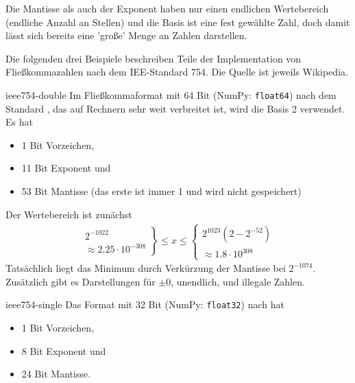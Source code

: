 \begin{intro}
  Die Mantisse als auch der Exponent haben nur einen endlichen Wertebereich
  (endliche Anzahl an Stellen) und die Basis ist eine fest gewählte Zahl, doch damit lässt sich
  bereits eine 'große' Menge an Zahlen darstellen.
  
  Die folgenden drei Beispiele beschreiben Teile der Implementation
  von Fließkommazahlen nach dem IEE-Standard 754. Die Quelle ist
  jeweils Wikipedia.
\end{intro}
\begin{Beispiel}{ieee754-double}
  Im Fließkommaformat mit 64 Bit (NumPy: \texttt{float64}) nach dem Standard
  , das auf Rechnern sehr weit verbreitet ist, wird
  die Basis 2 verwendet. Es hat
  \begin{itemize}
  \item 1 Bit Vorzeichen,
  \item 11 Bit Exponent und
  \item 53 Bit Mantisse (das erste ist immer 1 und wird nicht gespeichert)
  \end{itemize}
  Der Wertebereich ist zunächst
  \begin{gather}
    \left.
      \begin{matrix}
        2^{-1022} \\ \approx 2.25 \cdot 10^{-308}
      \end{matrix}
    \right\}
    \le x \le
    \left\{
      \begin{matrix}
        2^{1023}(2-2^{-52}) \\
        \approx 1.8 \cdot 10^{308}
      \end{matrix}
    \right.
  \end{gather}
  Tatsächlich liegt das Minimum durch Verkürzung der Mantisse bei
  $2^{-1074}$. Zusätzlich gibt es Darstellungen für $\pm 0$,
  unendlich, und illegale Zahlen.
\end{Beispiel}

\begin{Beispiel}{ieee754-single}
  Das Format mit 32 Bit (NumPy: \texttt{float32}) nach  hat
  \begin{itemize}
  \item 1 Bit Vorzeichen,
  \item 8 Bit Exponent und
  \item 24 Bit Mantisse.
  \end{itemize}
\end{Beispiel}

